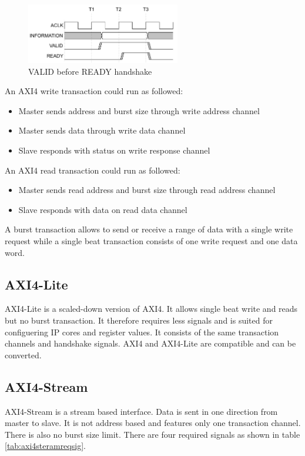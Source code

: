 \begin{figure}[h!]
    \centering
    \includegraphics[width=0.6\textwidth]{images/theory/axi4handshake.png}
    \caption{VALID before READY handshake \cite{axispecs}}
    \label{fig:axihandshake}
\end{figure}

An AXI4 write transaction could run as followed:
\begin{itemize}
    \item Master sends address and burst size through write address channel
    \item Master sends data through write data channel
    \item Slave responds with status on write response channel
\end{itemize}

An AXI4 read transaction could run as followed:
\begin{itemize}
    \item Master sends read address and burst size through read address channel
    \item Slave responds with data on read data channel
\end{itemize}

A burst transaction allows to send or receive a range of data with a single
write
request while a single beat transaction consists of one write request and one
data word.

\subsection{AXI4-Lite}
AXI4-Lite is a scaled-down version of AXI4. It allows single beat write and
reads but no burst transaction. It therefore requires less signals and is suited
for configuering IP cores and register values. It consists of the same
transaction channels and handshake signals. AXI4 and AXI4-Lite are compatible
and can be converted.

\subsection{AXI4-Stream}
AXI4-Stream is a stream based interface. Data is sent in one direction from
master to slave. It is not address based and features only one transaction
channel. There is also no burst size limit. There are four required signals as
shown in table \ref{tab:axi4steramreqsig}.

